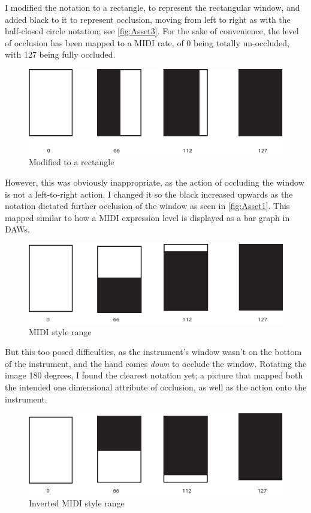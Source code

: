 I modified the notation to a rectangle, to represent the rectangular window, and added black to it to represent occlusion, moving from left to right as with the half-closed circle notation; see \autoref{fig:Asset3}.
For the sake of convenience, the level of occlusion has been mapped to a MIDI rate, of 0 being totally un-occluded, with 127 being fully occluded.

\begin{figure}
    \includegraphics[width=\linewidth]{./resources/Asset 3.pdf}
    \caption{Modified to a rectangle}\label{fig:Asset3}
\end{figure}

However, this was obviously inappropriate, as the action of occluding the window is not a left-to-right action.
I changed it so the black increased upwards as the notation dictated further occlusion of the window as seen in \autoref{fig:Asset1}. 
This mapped similar to how a MIDI expression level is displayed as a bar graph in DAWs. 
\begin{figure}
    \includegraphics[width=\linewidth]{./resources/Asset 1.pdf}
    \caption{MIDI style range}\label{fig:Asset1}
\end{figure}

But this too posed difficulties, as the instrument's window wasn't on the bottom of the instrument, and the hand comes \emph{down} to occlude the window. 
Rotating the image 180 degrees, I found the clearest notation yet; a picture that mapped both the intended one dimensional attribute of occlusion, as well as the action onto the instrument.

\begin{figure}
    \includegraphics[width=\linewidth]{./resources/Asset 2.pdf}
    \caption{Inverted MIDI style range}\label{fig:Asset2}
\end{figure}

